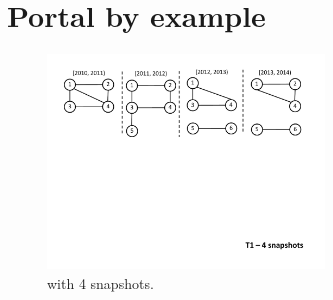 \section{Portal by example}
\label{sec:language}

\begin{figure}[t!]
  \includegraphics[width=2.9in]{figs/4snaps_T1.pdf}
  \caption{\tg {} with 4 snapshots.}
  \vspace{-0.5cm}
  \label{fig:tg_t1}
  \vspace{-0.2cm}
\end{figure}

